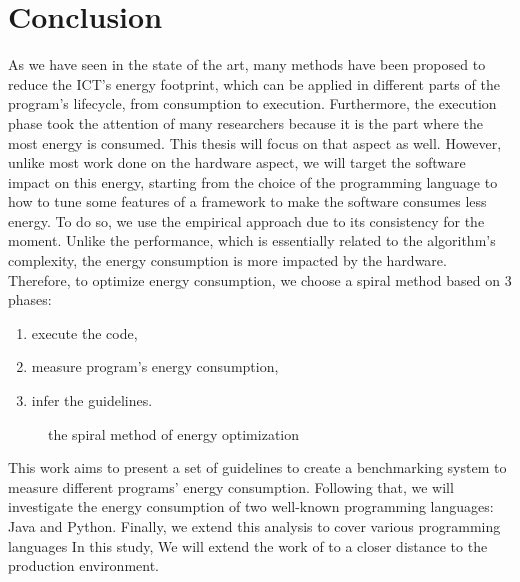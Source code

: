 \section{Conclusion}
As we have seen in the state of the art, many methods have been proposed to reduce the ICT's energy footprint, which can be applied in different parts of the program's lifecycle, from consumption to execution.
Furthermore, the execution phase took the attention of many researchers because it is the part where the most energy is consumed.
This thesis will focus on that aspect as well.
However, unlike most work done on the hardware aspect, we will target the software impact on this energy, starting from the choice of the programming language to how to tune some features of a framework to make the software consumes less energy.
To do so, we use the empirical approach due to its consistency for the moment.
Unlike the performance, which is essentially related to the algorithm's complexity, the energy consumption is more impacted by the hardware.
Therefore, to optimize energy consumption, we choose a spiral method based on 3 phases:
\begin{enumerate}
    \item execute the code,
    \item measure program's energy consumption,
    \item infer the guidelines.
\end{enumerate}

\begin{figure}[!hbt]
    \caption{the spiral method of energy optimization }\label{fig:spirals}
\end{figure}

This work aims to present a set of guidelines to create a benchmarking system to measure different programs' energy consumption.
Following that, we will investigate the energy consumption of two well-known programming languages: Java and Python.
Finally, we extend this analysis to cover various programming languages
In this study, We will extend the work of \citeauthor{pereira_energy_2017} to a closer distance to the production environment.

